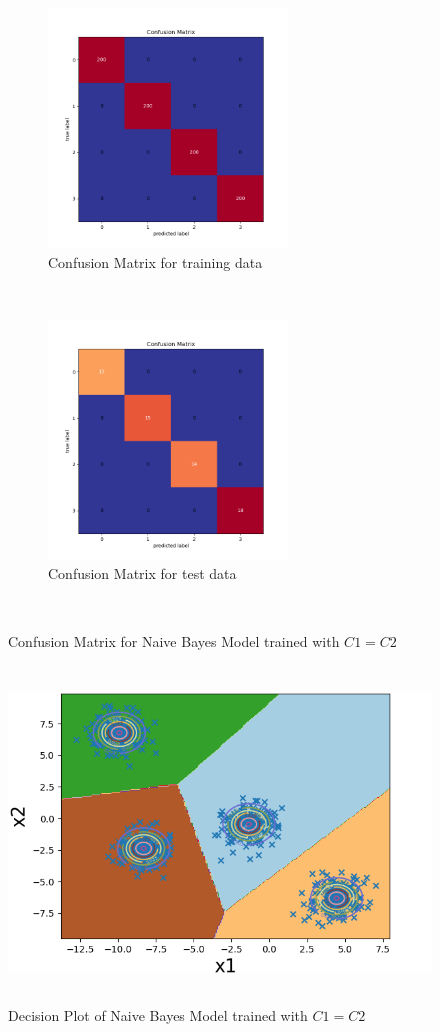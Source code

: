 \begin{figure}[!ht]
    \centering
    \begin{subfigure}[t]{0.5\textwidth}
        \centering
        \includegraphics[height=2.5in]{Dataset_1a/Naive_Bayes_Classifier_case1_cmatrix_train_data.png}
        \caption{Confusion Matrix for training data}
    \end{subfigure}%
    ~ 
    \begin{subfigure}[t]{0.5\textwidth}
        \centering
        \includegraphics[height=2.5in]{Dataset_1a/Naive_Bayes_Classifier_case1_cmatrix_test_data.png}
        \caption{Confusion Matrix for test data}
    \end{subfigure}%
    ~
    \caption{Confusion Matrix for Naive Bayes Model trained with $C1=C2$}
    \label{fig:9}
\end{figure}

\begin{figure}[!ht]
    \centering
    \includegraphics[height=3.5in]{Dataset_1a/Naive_Bayes_Classifier_case2_decision_plot.png}
    \caption{Decision Plot of Naive Bayes Model trained with $C1=C2$ }
    \label{fig:10}
\end{figure}

